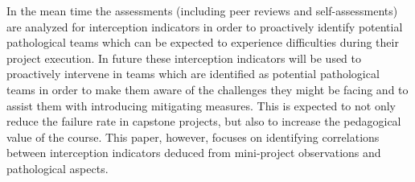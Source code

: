 In the mean time the assessments (including peer reviews and self-assessments) are analyzed for interception indicators in order to proactively identify potential pathological teams which can be expected to experience difficulties during their project execution. In future these interception indicators will be used to proactively intervene in teams which are identified as potential pathological teams in order to make them aware of the challenges they might be facing and to assist them with introducing mitigating measures. This is expected to not only reduce the failure rate in capstone projects, but also to increase the pedagogical value of the course. This paper, however, focuses on identifying correlations between interception indicators deduced from mini-project observations and pathological aspects. 
